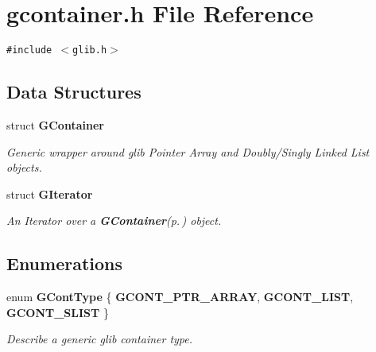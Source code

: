 \section{gcontainer.h File Reference}
\label{gcontainer_8h}
{\tt \#include $<$glib.h$>$}\par
\subsection*{Data Structures}
\begin{CompactItemize}
\item 
struct {\bf GContainer}
\begin{CompactList}\small\item\em Generic wrapper around glib Pointer Array and Doubly/Singly Linked List objects. \item\end{CompactList}\item 
struct {\bf GIterator}
\begin{CompactList}\small\item\em An Iterator over a {\bf GContainer}{\rm (p.\,\pageref{structGContainer})} object. \item\end{CompactList}\end{CompactItemize}
\subsection*{Enumerations}
\begin{CompactItemize}
\item 
enum {\bf GCont\-Type} \{ {\bf GCONT\_\-PTR\_\-ARRAY}, 
{\bf GCONT\_\-LIST}, 
{\bf GCONT\_\-SLIST}
 \}
\begin{CompactList}\small\item\em Describe a generic glib container type. \item\end{CompactList}\end{CompactItemize}
